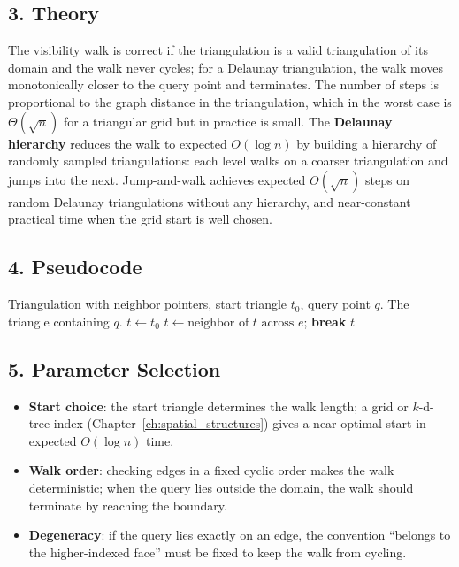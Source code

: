 \subsection{3. Theory}

The visibility walk is correct if the triangulation is a valid
triangulation of its domain and the walk never cycles; for a Delaunay
triangulation, the walk moves monotonically closer to the query point and
terminates. The number of steps is proportional to the graph distance in
the triangulation, which in the worst case is $\Theta(\sqrt{n})$ for a
triangular grid but in practice is small. The \textbf{Delaunay hierarchy}
\cite{devillers2002} reduces the walk to expected $O(\log n)$ by building
a hierarchy of randomly sampled triangulations: each level walks on a
coarser triangulation and jumps into the next. Jump-and-walk
\cite{mucke1999} achieves expected $O(\sqrt{n})$ steps on random Delaunay
triangulations without any hierarchy, and near-constant practical time when
the grid start is well chosen.

\subsection{4. Pseudocode}

\begin{algorithm}[htbp]
\caption{Visibility Walk in a Triangulation}
\label{alg:pointloc_visibility_walk}
\begin{algorithmic}[1]
\Require Triangulation with neighbor pointers, start triangle $t_0$, query point $q$.
\Ensure The triangle containing $q$.
  \State $t \gets t_0$
        \State $t \gets \text{neighbor of } t \text{ across } e$; \textbf{break}
      \EndIf
    \EndFor
     \State \Return $t$ \EndIf
  \EndWhile
\EndFunction
\end{algorithmic}
\end{algorithm}

\subsection{5. Parameter Selection}

\begin{itemize}
\item \textbf{Start choice}: the start triangle determines the walk length;
  a grid or $k$-d-tree index (Chapter~\ref{ch:spatial_structures}) gives a
  near-optimal start in expected $O(\log n)$ time.
\item \textbf{Walk order}: checking edges in a fixed cyclic order makes the
  walk deterministic; when the query lies outside the domain, the walk
  should terminate by reaching the boundary.
\item \textbf{Degeneracy}: if the query lies exactly on an edge, the
  convention ``belongs to the higher-indexed face'' must be fixed to keep
  the walk from cycling.
\end{itemize}

